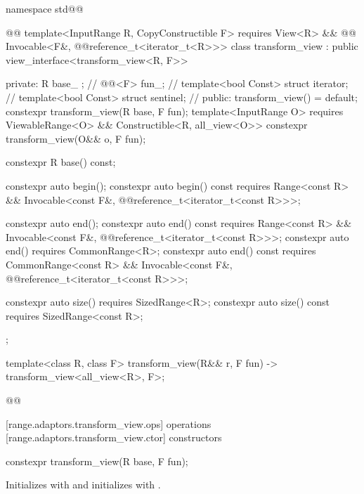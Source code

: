 {\begin{codeblock}
namespace std@@ { @@
  template<InputRange R, CopyConstructible F>
    requires View<R> && @@ Invocable<F&, @@reference_t<iterator_t<R>>>
  class transform_view : public view_interface<transform_view<R, F>> {
  private:
    R base_ {};          // \expos
    @@<F> fun_; // \expos
    template<bool Const>
      struct iterator;   // \expos
    template<bool Const>
      struct sentinel;   // \expos
  public:
    transform_view() = default;
    constexpr transform_view(R base, F fun);
    template<InputRange O>
      requires ViewableRange<O> && Constructible<R, all_view<O>>
    constexpr transform_view(O&& o, F fun);

    constexpr R base() const;

    constexpr auto begin();
    constexpr auto begin() const requires Range<const R> &&
      Invocable<const F&, @@reference_t<iterator_t<const R>>>;

    constexpr auto end();
    constexpr auto end() const requires Range<const R> &&
      Invocable<const F&, @@reference_t<iterator_t<const R>>>;
    constexpr auto end() requires CommonRange<R>;
    constexpr auto end() const requires CommonRange<const R> &&
      Invocable<const F&, @@reference_t<iterator_t<const R>>>;

    constexpr auto size() requires SizedRange<R>;
    constexpr auto size() const requires SizedRange<const R>;
  };

  template<class R, class F>
  transform_view(R&& r, F fun) -> transform_view<all_view<R>, F>;
}@\oldtxt{\}}@
\end{codeblock}

[range.adaptors.transform_view.ops]{ operations}
[range.adaptors.transform_view.ctor]{ constructors}

%
\begin{itemdecl}
constexpr transform_view(R base, F fun);
\end{itemdecl}

\begin{itemdescr}
\pnum
\effects Initializes  with  and initializes
 with .
\end{itemdescr}

}
